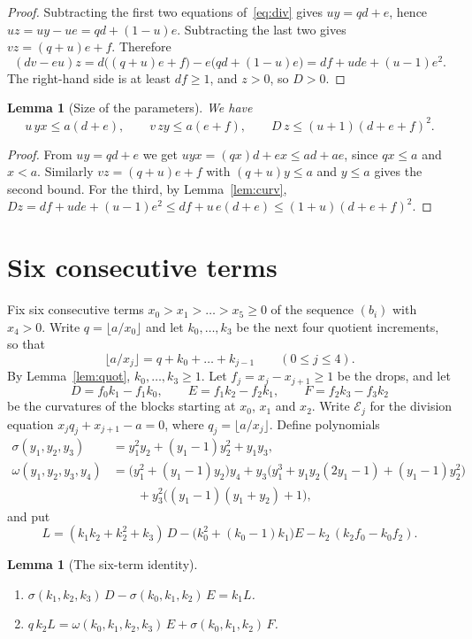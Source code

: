 \documentclass[11pt]{article}
\newtheorem{lemma}[theorem]{Lemma}
\theoremstyle{definition}
\theoremstyle{remark}
\begin{document}
\begin{proof}
Subtracting the first two equations of~\eqref{eq:div} gives $uy=qd+e$, hence
$uz=uy-ue=qd+(1-u)e$. Subtracting the last two gives $vz=(q+u)e+f$. Therefore
\[
(dv-eu)z=d\bigl((q+u)e+f\bigr)-e\bigl(qd+(1-u)e\bigr)=df+ude+(u-1)e^2 .
\]
The right-hand side is at least $df\ge1$, and $z>0$, so $D>0$.
\end{proof}

\begin{lemma}[Size of the parameters]\label{lem:size}
We have
\[
u\,yx\le a(d+e),\qquad v\,zy\le a(e+f),\qquad D\,z\le (u+1)(d+e+f)^2 .
\]
\end{lemma}

\begin{proof}
From $uy=qd+e$ we get $uyx=(qx)d+ex\le ad+ae$, since $qx\le a$ and $x<a$. Similarly
$vz=(q+u)e+f$ with $(q+u)y\le a$ and $y\le a$ gives the second bound. For the third, by
Lemma~\ref{lem:curv},
$Dz=df+ude+(u-1)e^2\le df+u\,e(d+e)\le (1+u)(d+e+f)^2$.
\end{proof}

\section{Six consecutive terms}\label{sec:six}

Fix six consecutive terms $x_0>x_1>\dots>x_5\ge0$ of the sequence $(b_i)$ with $x_4>0$.
Write $q=\lfloor a/x_0\rfloor$ and let $k_0,\dots,k_3$ be the next four quotient
increments, so that
\[
\lfloor a/x_j\rfloor=q+k_0+\dots+k_{j-1}\qquad(0\le j\le4).
\]
By Lemma~\ref{lem:quot}, $k_0,\dots,k_3\ge1$. Let $f_j=x_j-x_{j+1}\ge1$ be the drops, and let
\[
D=f_0k_1-f_1k_0,\qquad E=f_1k_2-f_2k_1,\qquad F=f_2k_3-f_3k_2
\]
be the curvatures of the blocks starting at $x_0$, $x_1$ and $x_2$. Write $\mathcal E_j$ for the division
equation $x_jq_j+x_{j+1}-a=0$, where $q_j=\lfloor a/x_j\rfloor$. Define polynomials
\begin{align*}
\sigma(y_1,y_2,y_3)&=y_1^2y_2+(y_1-1)y_2^2+y_1y_3,\\
\omega(y_1,y_2,y_3,y_4)&=\bigl(y_1^2+(y_1-1)y_2\bigr)y_4+y_3\bigl(y_1^3+y_1y_2(2y_1-1)+(y_1-1)y_2^2\bigr)\\
&\qquad+y_3^2\bigl((y_1-1)(y_1+y_2)+1\bigr),
\end{align*}
and put
\[
L=(k_1k_2+k_2^2+k_3)\,D-\bigl(k_0^2+(k_0-1)k_1\bigr)E-k_2\,(k_2f_0-k_0f_2).
\]

\begin{lemma}[The six-term identity]\label{lem:six}
\begin{enumerate}
\item $\sigma(k_1,k_2,k_3)\,D-\sigma(k_0,k_1,k_2)\,E=k_1L$.
\item $q\,k_2L=\omega(k_0,k_1,k_2,k_3)\,E+\sigma(k_0,k_1,k_2)\,F$.
\end{enumerate}
\end{lemma}
\end{document}
